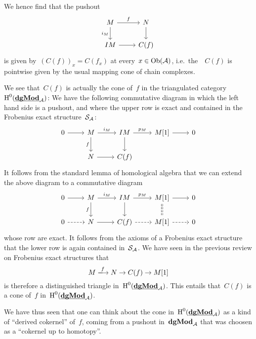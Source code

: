 \documentclass[a4paper,10pt]{scrartcl}
\begin{document}
We hence find that the pushout
\[
  \begin{tikzcd}
    M
    \arrow{r}[above]{f}
    \arrow{d}[left]{i_M}
    &
    N
    \arrow{d}
    \\
    IM
    \arrow{r}
    &
    C(f)
  \end{tikzcd}
\]
is given by~$(C(f))_x = C(f_x)$ at every~$x \in \operatorname{Ob}(\mathcal{A})$, i.e.\ the~{\dgmodule{$\Acat$}}~$C(f)$ is pointwise given by the usual mapping cone of chain complexes.

We see that~$C(f)$ is actually the cone of~$f$ in the triangulated category~$\operatorname{H}^0(\underline{\smash{\mathbf{dgMod}}}_{\mathcal{A}})$:
We have the following commutative diagram in which the left hand side is a pushout, and where the upper row is exact and contained in the Frobenius exact structure~$\mathcal{S}_{\mathcal{A}}$:
\[
  \begin{tikzcd}
    0
    \arrow{r}
    &
    M
    \arrow{r}[above]{i_M}
    \arrow{d}[left]{f}
    &
    IM
    \arrow{r}[above]{p_M}
    \arrow{d}
    &
    M[1]
    \arrow{r}
    &
    0
    \\
    {}
    &
    N
    \arrow{r}
    &
    C(f)
    &
    {}
    &
    {}
  \end{tikzcd}
\]
It follows from the standard lemma of homological algebra that we can extend the above diagram to a commutative diagram
\[
  \begin{tikzcd}
    0
    \arrow{r}
    &
    M
    \arrow{r}[above]{i_M}
    \arrow{d}[left]{f}
    &
    IM
    \arrow{r}[above]{p_M}
    \arrow{d}
    &
    M[1]
    \arrow{r}
    \arrow[dashed,equal]{d}
    &
    0
    \\
    0
    \arrow[dashed]{r}
    &
    N
    \arrow{r}
    &
    C(f)
    \arrow[dashed]{r}
    &
    M[1]
    \arrow[dashed]{r}
    &
    0
  \end{tikzcd}
\]
whose row are exact.
It follows from the axioms of a Frobenius exact structure that the lower row is again contained in~$\mathcal{S}_{\mathcal{A}}$.
We have seen in the previous review on Frobenius exact structures that
\[
  M
  \xlongto{f}
  N
  \to
  C(f)
  \to
  M[1]
\]
is therefore a distinguished triangle in~$\operatorname{H}^0(\underline{\smash{\mathbf{dgMod}}}_{\mathcal{A}})$.
This entails that~$C(f)$ is a cone of~$f$ in~$\operatorname{H}^0(\underline{\smash{\mathbf{dgMod}}}_{\mathcal{A}})$.

We have thus seen that one can think about the cone in~$\operatorname{H}^0(\underline{\smash{\mathbf{dgMod}}}_{\mathcal{A}})$ as a kind of \enquote{derived cokernel} of~$f$, coming from a pushout in~$\mathbf{dgMod}_{\mathcal{A}}$ that was choosen as a \enquote{cokernel up to homotopy}.
\end{document}
